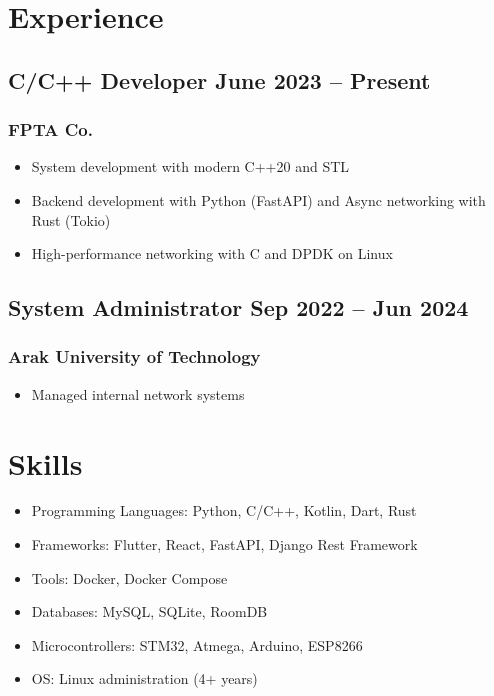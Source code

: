 \documentclass[12pt]{article}
\begin{document}
\section{Experience}
\subsection{C/C++ Developer \hfill \footnotesize June 2023 -- Present}
\subsubsection{FPTA Co.}
\begin{itemize}
  \item System development with modern C++20 and STL
  \item Backend development with Python (FastAPI) and Async
    networking with Rust (Tokio)
  \item High-performance networking with C and DPDK on Linux
\end{itemize}

\subsection{System Administrator \hfill \footnotesize Sep 2022 -- Jun 2024}
\subsubsection{Arak University of Technology}
\begin{itemize}
  \item Managed internal network systems
\end{itemize}

\section{Skills}
\begin{itemize}
  \item Programming Languages: {\hfill Python, C/C++, Kotlin, Dart, Rust}
  \item Frameworks: {\hfill Flutter, React, FastAPI, Django Rest Framework}
  \item Tools: {\hfill Docker, Docker Compose}
  \item Databases: {\hfill MySQL, SQLite, RoomDB}
  \item Microcontrollers: {\hfill STM32, Atmega, Arduino, ESP8266}
  \item OS: {\hfill Linux administration (4+ years)}
\end{itemize}
\end{document}
